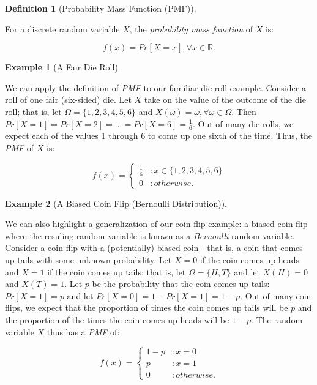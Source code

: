 \documentclass[
]{article}
\theoremstyle{definition}
\newtheorem{definition}{Definition}[section]
\theoremstyle{definition}
\newtheorem{example}{Example}[section]
\theoremstyle{definition}
\theoremstyle{remark}
\begin{document}
\begin{definition}[Probability Mass Function (PMF)]
\protect\hypertarget{def:unlabeled-div-21}{}\label{def:unlabeled-div-21}

For a discrete random variable \(X\), the \emph{probability mass function} of \(X\) is:

\[f(x) = Pr[X = x], \forall x \in \mathbb{R}.\]

\end{definition}

\begin{example}[A Fair Die Roll]
\protect\hypertarget{exm:unlabeled-div-22}{}\label{exm:unlabeled-div-22}

We can apply the definition of \emph{PMF} to our familiar die roll example. Consider a roll of one fair (six-sided) die. Let \(X\) take on the value of the outcome of the die roll; that is, let \(\Omega = \{1,2,3,4,5,6\}\) and \(X(\omega) = \omega, \forall \omega \in \Omega\). Then \(Pr[X = 1] = Pr[X = 2] = ... = Pr[X = 6] = \frac{1}{6}\). Out of many die rolls, we expect each of the values 1 through 6 to come up one sixth of the time. Thus, the \emph{PMF} of \(X\) is:

\[f(x) = \begin{cases} \frac{1}{6} & : x \in \{1,2,3,4,5,6\} \\ 0 & : otherwise. \end{cases}\]

\end{example}

\begin{example}[A Biased Coin Flip (Bernoulli Distribution)]
\protect\hypertarget{exm:unlabeled-div-23}{}\label{exm:unlabeled-div-23}

We can also highlight a generalization of our coin flip example: a biased coin flip where the resuling random variable is known as a \emph{Bernoulli} random variable. Consider a coin flip with a (potentially) biased coin - that is, a coin that comes up tails with some unknown probability. Let \(X = 0\) if the coin comes up heads and \(X = 1\) if the coin comes up tails; that is, let \(\Omega = \{H,T\}\) and let \(X(H) = 0\) and \(X(T) = 1\). Let \(p\) be the probability that the coin comes up tails: \(Pr[X = 1] = p\) and let \(Pr[X = 0] = 1 - Pr[X = 1] = 1 - p\). Out of many coin flips, we expect that the proportion of times the coin comes up tails will be \(p\) and the proportion of the times the coin comes up heads will be \(1 - p\). The random variable \(X\) thus has a \emph{PMF} of:

\[f(x) = \begin{cases} 1 - p & : x = 0 \\ p & : x = 1 \\ 0 & : otherwise. \end{cases}\]

\end{example}
\end{document}
